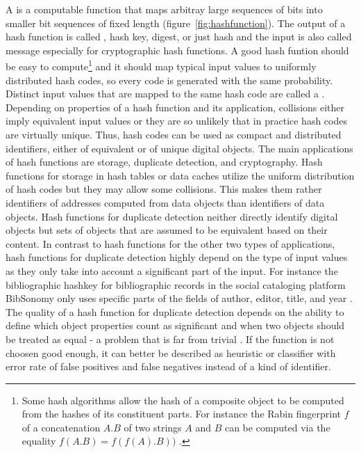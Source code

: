 A  is a computable function that maps arbitray large 
sequences of bits into smaller bit sequences of fixed length
(figure~\ref{fig:hashfunction}). The output of
a hash function is called , hash key, digest, or just hash 
and the input is also called message especially for cryptographic 
hash functions. A good hash funtion should be easy to compute\footnote{
Some hash algorithms allow the hash of a composite object to be computed 
from the hashes of its constituent parts. For instance the Rabin fingerprint
$f$ of a concatenation $A.B$ of two strings $A$ and $B$ can be computed via 
the equality $f(A.B)=f(f(A).B))$ \cite{Broder1993}.} and it should map typical
input values to uniformly distributed hash codes, so every code is 
generated with the same probability. Distinct input values that are mapped to
the same hash code are called a . Depending on properties of a 
hash function and its application, collisions either imply equivalent input
values or they are so unlikely that in practice hash codes are virtually 
unique. Thus, hash codes can be used as compact and distributed identifiers,
either of equivalent or of unique digital objects. The main applications of 
hash functions are storage, duplicate detection, and cryptography. Hash 
functions for storage in hash tables or data caches utilize the uniform 
distribution of hash codes but they may allow some collisions. This makes 
them rather identifiers of addresses computed from data objects than 
identifiers of data objects. Hash functions for duplicate detection neither
directly identify digital objects but sets of objects that are assumed to be
equivalent based on their content. In contrast to hash functions for the other
two types of applications, hash functions for duplicate detection highly
depend on the type of input values as they only take into account a 
significant part of the input. For instance the bibliographic hashkey for
bibliographic records in the social cataloging platform BibSonomy only uses
specific parts of the fields of author, editor, title, and year 
\cite{Voss2009}. The quality of a hash function for duplicate detection
depends on the ability to define which object properties count as significant
and when two objects should be treated as equal - a problem that is far
from trivial \cite{Renear2009,Yeo2010}. If the function is not choosen
good enough, it can better be described as heuristic or classifier with
error rate of false positives and false negatives instead of a kind of
identifier.

